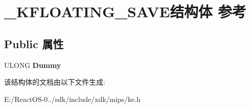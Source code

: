 \hypertarget{struct___k_f_l_o_a_t_i_n_g___s_a_v_e}{}\section{\+\_\+\+K\+F\+L\+O\+A\+T\+I\+N\+G\+\_\+\+S\+A\+V\+E结构体 参考}
\label{struct___k_f_l_o_a_t_i_n_g___s_a_v_e}
\subsection*{Public 属性}
\begin{DoxyCompactItemize}
\item 
\mbox{\label{struct___k_f_l_o_a_t_i_n_g___s_a_v_e_ad9c788b2d2e56258ed56ad904edeecdb}} 
U\+L\+O\+NG {\bfseries Dummy}
\end{DoxyCompactItemize}


该结构体的文档由以下文件生成\+:\begin{DoxyCompactItemize}
\item 
E\+:/\+React\+O\+S-\/0../sdk/include/xdk/mips/ke.\+h\end{DoxyCompactItemize}

